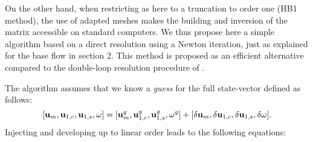 \documentclass[twocolumn,10pt]{asme2ej}
\begin{document}
On the other hand, when restricting as here to a truncation to order one (HB1 method), the use of adapted meshes makes the building and inversion of the matrix accessible on standard computers. We thus propose here a simple algorithm based on a direct resolution using a Newton iteration, just as explained for the base flow in section 2. This method is proposed as an efficient alternative compared to the double-loop resolution procedure of \cite{MLugo2014}.

The algorithm assumes that we know a {\em guess} for the full state-vector defined as follows:
$$
[{\bf u }_m, {\bf u }_{1,c}, {\bf u }_{1,s}, \omega] = 
 [{\bf u }_m^g, {\bf u }_{1,c}^g, {\bf u }_{1,s}^g, \omega^g]
+ [\delta {\bf u }_m, \delta {\bf u }_{1,c}, \delta {\bf u }_{1,s}, \delta \omega].
$$
Injecting and developing up to linear order leads to the following equations:
\iffalse
\begin{subequations}\label{eq:harmonic_total}
\begin{eqnarray}
\begin{split}
&{\cal NS}(  {\bf u }_m^g ) - \frac{1}{4} \big[ {\cal C}( {\bf u }_{1,c}^g,{\bf u }_{1,c}^g) +  {\cal C}( {\bf u }_{1,s}^g,{\bf u }_{1,s}^g) \big]+ {\cal LNS}_{{\bf u }_m^g}(\delta {\bf u }_m)
\\
&-\frac{1}{2} \big[ {\cal C}( {\bf u }_{1,c}^g,\delta {\bf u }_{1,c}) +  {\cal C}( {\bf u }_{1,s}^g,\delta {\bf u }_{1,s}) \big] = 0,
\end{split}
\label{HB_1}
\\
\begin{split}
{\cal LNS}_{{\bf u }_m^g}( {\bf u }_{1,c}^g) - \omega^g {\bf u }_{1,s}^g& -  {\cal C}( \delta {\bf u }_{m}, {\bf u }_{1,c}^g)
\\
&+{\cal LNS}_{{\bf u }_m^g}( \delta {\bf u }_{1,c})  - \omega^g \delta {\bf u }_{1,s}  
 - \delta \omega {\bf u }_{1,s}^g = 0 ,
 \end{split}
\label{HB_2}
\\
\begin{split}
{\cal LNS}_{{\bf u }_m^g}({\bf u }_{1,s}^g) + \omega^g {\bf u }_{1,c}^g& -  {\cal C}( \delta {\bf u }_{m}, {\bf u }_{1,s}^g)
\\
&+{\cal LNS}_{{\bf u }_m^g}( \delta {\bf u }_{1,s}) + \omega^g \delta {\bf u }_{1,c} +  \delta \omega {\bf u }_{1,c}^g= 0 ,
\end{split}
\label{HB_3}
\\
\begin{split}
 F_y({\bf u }_{1,s}^g) + F_y(\delta {\bf u }_{1,s}) = 0. \qquad \qquad \qquad \qquad \qquad \qquad \quad
\end{split}
\end{eqnarray}
\end{subequations}
\fi
\end{document}
